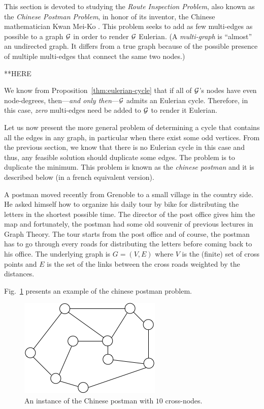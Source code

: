 This section is devoted to studying the {\it Route Inspection
  Problem},  also known as the {\it
  Chinese Postman Problem},  in honor
of its inventor, the Chinese mathematician Kwan Mei-Ko  \cite{Kwan60}.  This problem seeks to add as few multi-edges
 as possible to a graph $\mbox{$\cal G$}$ in
order to render $\mbox{$\cal G$}$ Eulerian.  (A {\it multi-graph} is ``almost'' an
undirected graph.  It differs from a true graph because of the
possible presence of multiple multi-edges that connect the same two
nodes.)

**HERE


We know from Proposition~\ref{thm:eulerian-cycle} that if all of
$\mbox{$\cal G$}$'s nodes have even node-degrees, then---{\em and only then}---$\mbox{$\cal G$}$
admits an Eulerian cycle.  Therefore, in this case, {\em zero}
multi-edges need be added to $\mbox{$\cal G$}$ to render it Eulerian.  

Let us now present the more general problem of determining a cycle that contains all the edges in any graph, in particular when
there exist some odd vertices. From the previous section, we know that there is no Eulerian cycle in this case and thus, 
any feasible solution should duplicate some edges.
The problem is to duplicate the minimum.
This problem is known as the {\it chinese postman} and it is described below (in a french equivalent version).

A postman moved recently from Grenoble to a small village in the country side. 
He asked himself how to organize his daily tour by bike for distributing the letters in the shortest possible time. 
The director of the post office gives him the map and 
fortunately, the postman had some old souvenir of previous lectures in Graph Theory.  
The tour starts from the post office and of course, the postman has to go through every roads for distributing the letters before coming back
to his office.
The underlying graph is $G=(V,E)$ where $V$ is the (finite) set of cross points and $E$ is the set of the links between the cross roads
weighted by the distances.  

Fig.~\ref{fig:EulerianInitial} presents an example of the chinese postman problem. 
\begin{figure}[hbt]
\begin{center}
       \includegraphics[scale=0.6]{FiguresGraph/EulerienInitial}
       \caption{An instance of the Chinese postman with $10$ cross-nodes.}
              \label{fig:EulerianInitial}
\end{center}
\end{figure}

